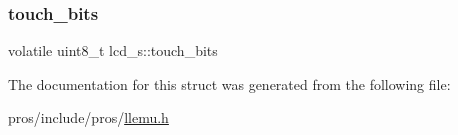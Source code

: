 \mbox{\label{structlcd__s_a6aaa4bc625cc13f48b47acd64bcfa757}} 
\subsubsection{\texorpdfstring{touch\+\_\+bits}{touch\_bits}}
{\footnotesize\ttfamily volatile uint8\+\_\+t lcd\+\_\+s\+::touch\+\_\+bits}



The documentation for this struct was generated from the following file\+:\begin{DoxyCompactItemize}
\item 
pros/include/pros/\hyperlink{llemu_8h}{llemu.\+h}\end{DoxyCompactItemize}

